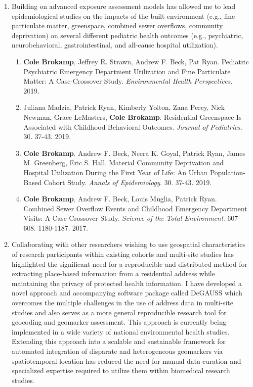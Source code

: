 \documentclass{nihbiosketch}
\begin{document}
\begin{enumerate}
\begin{enumerate}
\end{enumerate}

\item Building on advanced exposure assessment models has allowed me to lead epidemiological studies on the impacts of the built environment (e.g., fine particulate matter, greenspace, combined sewer overflows, community deprivation) on several different pediatric health outcomes (e.g., psychiatric, neurobehavioral, gastrointestinal, and all-cause hospital utilization).

  \begin{enumerate}

  \item \textbf{Cole Brokamp}, Jeffrey R. Strawn, Andrew F. Beck, Pat Ryan.
    Pediatric Psychiatric Emergency Department Utilization and Fine
    Particulate Matter: A Case-Crossover Study. \textit{Environmental Health
      Perspectives}. 2019.

  \item Juliana Madzia, Patrick Ryan, Kimberly Yolton, Zana Percy, Nick Newman, Grace
    LeMasters, \textbf{Cole Brokamp}. Residential Greenspace Is Associated with Childhood
    Behavioral Outcomes. \textit{Journal of Pediatrics}. 30. 37-43. 2019.

  \item \textbf{Cole Brokamp}, Andrew F. Beck, Neera K. Goyal, Patrick Ryan,
    James M. Greenberg, Eric S. Hall. Material Community Deprivation and
    Hospital Utilization During the First Year of Life: An Urban
    Population-Based Cohort Study. \textit{Annals of Epidemiology}. 30. 37-43.
    2019.

  \item \textbf{Cole Brokamp}, Andrew F. Beck, Louis Muglia, Patrick Ryan. Combined Sewer Overflow Events and Childhood Emergency Department Visits: A Case-Crossover Study. \textit{Science of the Total Environment}. 607-608. 1180-1187. 2017.
    
  \end{enumerate}

\item Collaborating with other researchers wishing to use geospatial
  characteristics of research participants within existing cohorts and
  multi-site studies has highlighted the significant need for a reproducible and
  distributed method for extracting place-based information from a residential
  address while maintaining the privacy of protected health information. I have
  developed a novel approach and accompanying software package called DeGAUSS
  which overcomes the multiple challenges in the use of address data in
  multi-site studies and also serves as a more general reproducible research
  tool for geocoding and geomarker assessment. This approach is currently being
  implemented in a wide variety of national environmental health studies. Extending this
  approach into a scalable and sustainable framework for automated integration of
  disparate and heterogeneous geomarkers via spatiotemporal location has reduced
  the need for manual data curation and specialized expertise required
  to utilize them within biomedical research studies.


\end{enumerate}
\end{document}
